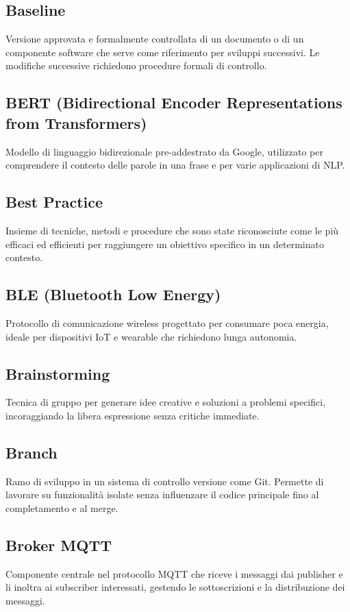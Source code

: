 \documentclass[a4paper,11pt]{article}
\begin{document}
\subsection{Baseline}
Versione approvata e formalmente controllata di un documento o di un componente software che serve come riferimento per sviluppi successivi. Le modifiche successive richiedono procedure formali di controllo.

\subsection{BERT (Bidirectional Encoder Representations from Transformers)}
Modello di linguaggio bidirezionale pre-addestrato da Google, utilizzato per comprendere il contesto delle parole in una frase e per varie applicazioni di NLP.

\subsection{Best Practice}
Insieme di tecniche, metodi e procedure che sono state riconosciute come le più efficaci ed efficienti per raggiungere un obiettivo specifico in un determinato contesto.

\subsection{BLE (Bluetooth Low Energy)}
Protocollo di comunicazione wireless progettato per consumare poca energia, ideale per dispositivi IoT e wearable che richiedono lunga autonomia.

\subsection{Brainstorming}
Tecnica di gruppo per generare idee creative e soluzioni a problemi specifici, incoraggiando la libera espressione senza critiche immediate.

\subsection{Branch}
Ramo di sviluppo in un sistema di controllo versione come Git. Permette di lavorare su funzionalità isolate senza influenzare il codice principale fino al completamento e al merge.

\subsection{Broker MQTT}
Componente centrale nel protocollo MQTT che riceve i messaggi dai publisher e li inoltra ai subscriber interessati, gestendo le sottoscrizioni e la distribuzione dei messaggi.
\end{document}
